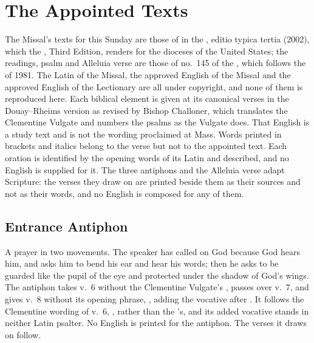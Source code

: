 \section{The Appointed Texts}
\label{sec:appointed-texts}

The Missal's texts for this Sunday are those of  in the , editio typica tertia (2002), which the
, Third Edition, renders for the dioceses of the United
States; the readings, psalm and Alleluia verse are those of no.~145 of the
, which follows the  of
1981. The Latin of the Missal, the approved English of the Missal and the
approved English of the Lectionary are all under copyright, and none of them
is reproduced here. Each biblical element is given at its canonical verses in
the Douay--Rheims version as revised by Bishop Challoner, which translates the
Clementine Vulgate and numbers the psalms as the Vulgate does. That English is
a study text and is not the wording proclaimed at Mass. Words printed in
brackets and italics belong to the verse but not to the appointed text. Each
oration is identified by the opening words of its Latin and described, and no
English is supplied for it. The three antiphons and the Alleluia verse adapt
Scripture: the verses they draw on are printed beside them as their sources and
not as their words, and no English is composed for any of them.

\subsection{Entrance Antiphon}
\label{proper-entrance-antiphon}


\noindent A prayer in two movements. The speaker has called on God because God
hears him, and asks him to bend his ear and hear his words; then he asks to be
guarded like the pupil of the eye and protected under the shadow of God's
wings. The antiphon takes v.~6 without the Clementine Vulgate's ,
passes over v.~7, and gives v.~8 without its opening phrase, , adding the vocative  after
. It follows the Clementine wording of v.~6, , rather than the 's, and its
added vocative stands in neither Latin psalter. No English is printed for the
antiphon. The verses it draws on follow.

